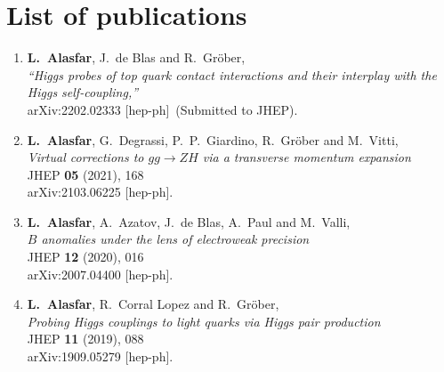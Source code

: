 
\chapter*{List of publications}
\begin{enumerate}
	\item \textbf{L.~Alasfar}, J.~de Blas and R.~Gr\"ober,\\
	\textit{``Higgs probes of top quark contact interactions and their interplay with the Higgs self-coupling,''} \\
	arXiv:2202.02333 [hep-ph]~(Submitted to JHEP).
 \item \textbf{L.~Alasfar}, G.~Degrassi, P.~P.~Giardino, R.~Gr\"ober and M.~Vitti,\\
 \textit{Virtual corrections to $gg\to ZH$ via a transverse momentum expansion}\\
 JHEP \textbf{05} (2021), 168\\ arXiv:2103.06225 [hep-ph].
\item \textbf{L.~Alasfar}, A.~Azatov, J.~de Blas, A.~Paul and M.~Valli,\\
\textit{$B$ anomalies under the lens of electroweak precision}\\
JHEP \textbf{12} (2020), 016\\
arXiv:2007.04400 [hep-ph].
\item \textbf{L.~Alasfar}, R.~Corral Lopez and R.~Gr\"ober,\\
\textit{Probing Higgs couplings to light quarks via Higgs pair production}\\
JHEP \textbf{11} (2019), 088\\
arXiv:1909.05279 [hep-ph].
\end{enumerate}%

%
